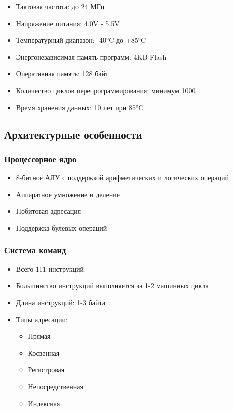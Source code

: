 \documentclass[a4paper, 12pt]{article}
\begin{document}
\begin{itemize}
    \item Тактовая частота: до 24 МГц
    \item Напряжение питания: 4.0V - 5.5V
    \item Температурный диапазон: -40°C до +85°C
    \item Энергонезависимая память программ: 4KB Flash
    \item Оперативная память: 128 байт
    \item Количество циклов перепрограммирования: минимум 1000
    \item Время хранения данных: 10 лет при 85°C
\end{itemize}

\subsection{Архитектурные особенности}
\subsubsection{Процессорное ядро}
\begin{itemize}
    \item 8-битное АЛУ с поддержкой арифметических и логических операций
    \item Аппаратное умножение и деление
    \item Побитовая адресация
    \item Поддержка булевых операций
\end{itemize}

\subsubsection{Система команд}
\begin{itemize}
    \item Всего 111 инструкций
    \item Большинство инструкций выполняется за 1-2 машинных цикла
    \item Длина инструкций: 1-3 байта
    \item Типы адресации:
    \begin{itemize}
        \item Прямая
        \item Косвенная
        \item Регистровая
        \item Непосредственная
        \item Индексная
    \end{itemize}
\end{itemize}
\end{document}
